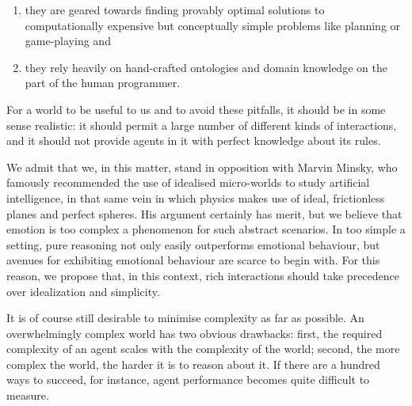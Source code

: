 \begin{enumerate}
	\item they are geared towards finding provably optimal solutions to computationally expensive but conceptually simple problems like planning or game-playing and
	\item they rely heavily on hand-crafted ontologies and domain knowledge on the part of the human programmer.
\end{enumerate}

For a world to be useful to us and to avoid these pitfalls, it should be in some sense realistic: it should permit a large number of different kinds of interactions, and it should not provide agents in it with perfect knowledge about its rules. 

We admit that we, in this matter, stand in opposition with Marvin Minsky, who famously recommended the use of idealised micro-worlds to study artificial intelligence, in that same vein in which physics makes use of ideal, frictionless planes and perfect spheres. His argument certainly has merit, but we believe that emotion is too complex a phenomenon for such abstract scenarios. In too simple a setting, pure reasoning not only easily outperforms emotional behaviour, but avenues for exhibiting emotional behaviour are scarce to begin with. For this reason, we propose that, in this context, rich interactions should take precedence over idealization and simplicity.

It is of course still desirable to minimise complexity as far as possible. An overwhelmingly complex world has two obvious drawbacks: first, the required complexity of an agent scales with the complexity of the world; second, the more complex the world, the harder it is to reason about it. If there are a hundred ways to succeed, for instance, agent performance becomes quite difficult to measure.
%
%
%
%
%
